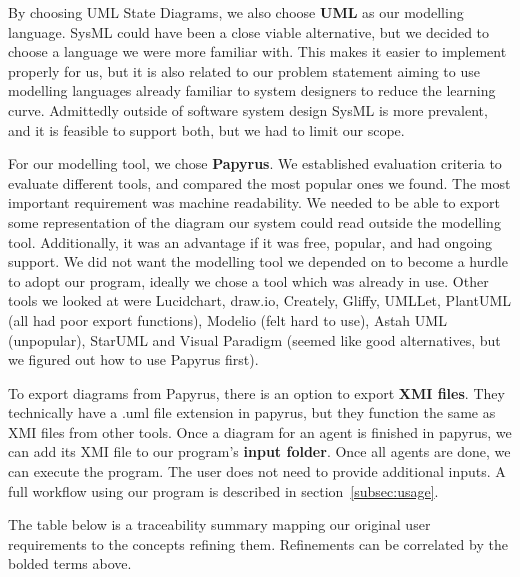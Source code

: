     By choosing UML State Diagrams, we also choose \textbf{UML} as our modelling language.
    SysML could have been a close viable alternative, but we decided to choose a language we were more familiar with.
    This makes it easier to implement properly for us,
    but it is also related to our problem statement aiming to use modelling languages already familiar to system designers to reduce the learning curve.
    Admittedly outside of software system design SysML is more prevalent, and it is feasible to support both, but we had to limit our scope.

    For our modelling tool, we chose \textbf{Papyrus}.
    We established evaluation criteria to evaluate different tools, and compared the most popular ones we found.
    The most important requirement was machine readability.
    We needed to be able to export some representation of the diagram our system could read outside the modelling tool.
    Additionally, it was an advantage if it was free, popular, and had ongoing support.
    We did not want the modelling tool we depended on to become a hurdle to adopt our program,
    ideally we chose a tool which was already in use.
    Other tools we looked at were Lucidchart, draw.io, Creately, Gliffy, UMLLet, PlantUML (all had poor export functions),
    Modelio (felt hard to use), Astah UML (unpopular),
    StarUML and Visual Paradigm (seemed like good alternatives, but we figured out how to use Papyrus first).

    To export diagrams from Papyrus, there is an option to export \textbf{XMI files}.
    They technically have a .uml file extension in papyrus, but they function the same as XMI files from other tools.
    Once a diagram for an agent is finished in papyrus, we can add its XMI file to our program's \textbf{input folder}.
    Once all agents are done, we can execute the program.
    The user does not need to provide additional inputs.
    A full workflow using our program is described in section~\ref{subsec:usage}.

    The table below is a traceability summary mapping our original user requirements to the concepts refining them.
    Refinements can be correlated by the bolded terms above.

